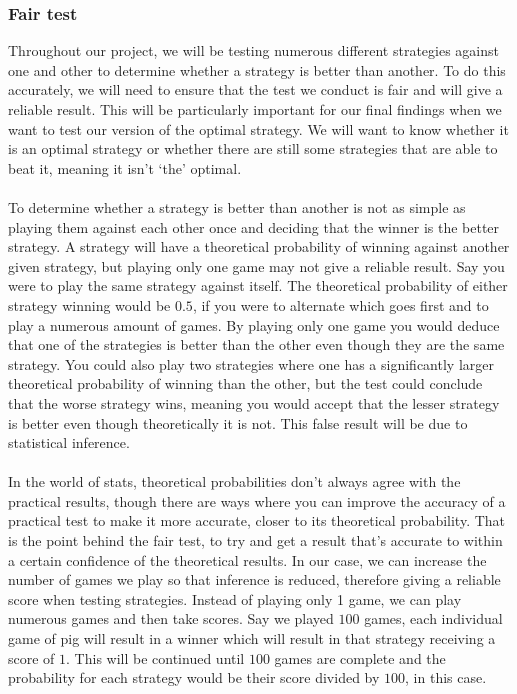\documentclass[a4paper,titlepage]{article}
\begin{document}
\subsubsection{Fair test}
Throughout our project, we will be testing numerous different strategies against one and other to determine whether a strategy is better than another. To do this accurately, we will need to ensure that the test we conduct is fair and will give a reliable result. This will be particularly important for our final findings when we want to test our version of the optimal strategy. We will want to know whether it is an optimal strategy or whether there are still some strategies that are able to beat it, meaning it isn’t `the' optimal.\\ \\
To determine whether a strategy is better than another is not as simple as playing them against each other once and deciding that the winner is the better strategy. A strategy will have a theoretical probability of winning against another given strategy, but playing only one game may not give a reliable result. Say you were to play the same strategy against itself.  The theoretical probability of either strategy winning would be $0.5$, if you were to alternate which goes first and to play a numerous amount of games. By playing only one game you would deduce that one of the strategies is better than the other even though they are the same strategy. You could also play two strategies where one has a significantly larger theoretical probability of winning than the other, but the test could conclude that the worse strategy wins, meaning you would accept that the lesser strategy is better even though theoretically it is not. This false result will be due to statistical inference.\\ \\
In the world of stats, theoretical probabilities don’t always agree with the practical results, though there are ways where you can improve the accuracy of a practical test to make it more accurate, closer to its theoretical probability. That is the point behind the fair test, to try and get a result that’s accurate to within a certain confidence of the theoretical results.  In our case, we can increase the number of games we play so that inference is reduced, therefore giving a reliable score when testing strategies.  Instead of playing only 1 game, we can play numerous games and then take scores. Say we played $100$ games, each individual game of pig will result in a winner which will result in that strategy receiving a score of $1$. This will be continued until $100$ games are complete and the probability for each strategy would be their score divided by $100$, in this case.\\ \\
\end{document}
